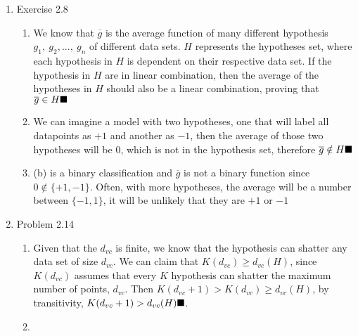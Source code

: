 \documentclass{article}
\begin{document}
    \begin{enumerate}
        \item Exercise 2.8
        \begin{enumerate}[label=(\alph*)]
            \item We know that $\overline{g}$ is the average function of many different hypothesis $g_1,\ g_2,...,\ g_n$ of different data sets. $H$ represents the hypotheses set, where each hypothesis in $H$ is dependent on their respective data set. If the hypothesis in $H$ are in linear combination, then the average of the hypotheses in $H$ should also be a linear combination, proving that $\overline{g} \in H \hfill \blacksquare$
            \item We can imagine a model with two hypotheses, one that will label all datapoints as $+1$ and another as $-1$, then the average of those two hypotheses will be $0$, which is not in the hypothesis set, therefore $\overline{g} \notin H \hfill \blacksquare$
            \item (b) is a binary classification and $\overline{g}$ is not a binary function since $0 \notin \{+1, -1\}$. Often, with more hypotheses, the average will be a number between $\{-1, 1\}$, it will be unlikely that they are $+1$ or $-1$
        \end{enumerate}

        \item Problem 2.14
        \begin{enumerate}
            \item Given that the $d_{vc}$ is finite, we know that the hypothesis can shatter any data set of size $d_{vc}$. We can claim that $K(d_{vc}) \geq d_{vc}(H)$, since $K(d_{vc})$ assumes that every $K$ hypothesis can shatter the maximum number of points, $d_{vc}$. Then $K(d_{vc} + 1) > K(d_{vc}) \geq d_{vc}(H)$, by transitivity, $K(d_{vc} + 1) > d_{vc}(H) \hfill \blacksquare$.
            \item 
        \end{enumerate}
    \end{enumerate}
\end{document}
